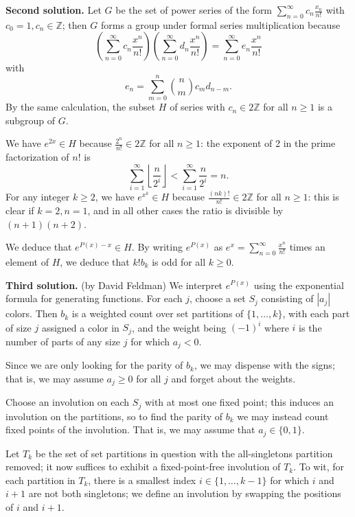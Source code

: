 \documentclass[amssymb,twocolumn,pra,10pt,aps]{revtex4-1}
\begin{document}
\begin{itemize}
\noindent
\textbf{Second solution.}
Let $G$ be the set of power series of the form $\sum_{n=0}^\infty c_n \frac{x_n}{n!}$ with $c_0 = 1, c_n \in \mathbb{Z}$; then $G$ forms a group under formal series multiplication because
\[
\left( \sum_{n=0}^\infty c_n \frac{x^n}{n!} \right)
\left( \sum_{n=0}^\infty d_n \frac{x^n}{n!} \right)
= \sum_{n=0}^\infty e_n \frac{x^n}{n!} 
\]
with
\[
e_n = \sum_{m=0}^n \binom{n}{m} c_m d_{n-m}.
\]
By the same calculation, the subset $H$ of series with $c_n \in 2\mathbb{Z}$ for all $n \geq 1$ is a subgroup of $G$.

We have $e^{2x} \in H$ because $\frac{2^n}{n!} \in 2\mathbb{Z}$ for all $n \geq 1$: the exponent of 2 in the prime factorization of $n!$ is
\[
\sum_{i=1}^\infty \left\lfloor \frac{n}{2^i} \right\rfloor
< \sum_{i=1}^\infty \frac{n}{2^i} = n.
\]
For any integer $k \geq 2$, we have $e^{x^k} \in H$ because $\frac{(nk)!}{n!} \in 2\mathbb{Z}$ for all $n \geq 1$: this is clear if $k=2,n=1$, and in all other cases the ratio is divisible by $(n+1)(n+2)$. 

We deduce that $e^{P(x)-x} \in H$.
By writing $e^{P(x)}$ as $e^x = \sum_{n=0}^\infty \frac{x^n}{n!}$
times an element of $H$, we deduce that $k! b_k$ is odd for all $k \geq 0$.

\noindent
\textbf{Third solution.}
(by David Feldman)
We interpret $e^{P(x)}$ using the exponential formula for generating functions.
For each $j$, choose a set $S_j$ consisting of $|a_j|$ colors.
Then $b_k$ is a weighted count over set partitions of $\{1,\dots,k\}$, with each part of size $j$ assigned a color in $S_j$, and the weight being $(-1)^i$ where $i$ is the number of parts of any size $j$ for which $a_j < 0$.

Since we are only looking for the parity of $b_k$, we may dispense with the signs; that is, we may assume $a_j \geq 0$ for all $j$
and forget about the weights.

Choose an involution on each $S_j$ with at most one fixed point; this induces an involution on the partitions, so to find the parity of $b_k$ we may instead count fixed points of the involution. That is, we may assume that $a_j \in \{0,1\}$.

Let $T_k$ be the set of set partitions in question with the all-singletons partition removed; it now suffices to exhibit a fixed-point-free involution of $T_k$. To wit, for each partition in $T_k$, there is a smallest index $i \in \{1,\dots,k-1\}$ for which $i$ and $i+1$ are not both singletons; we define an involution by swapping the positions of $i$ and $i+1$.


\end{itemize}
\end{document}
